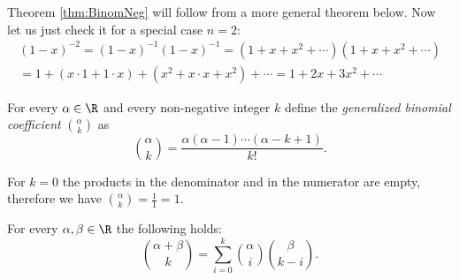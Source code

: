 \begin{page}
\setcounter{section}{2}
\setcounter{subsection}{4}
\setcounter{dfn}{14}
\label{portion:769}


Theorem \ref{thm:BinomNeg} will follow from a more general theorem below.
Now let us just check it for a special case $n=2$:
\begin{multline*}
(1-x)^{-2} = (1-x)^{-1} (1-x)^{-1} = (1 + x + x^2 + \cdots)(1 + x + x^2 + \cdots)\\
= 1 + (x \cdot 1 + 1 \cdot x) + (x^2 + x \cdot x + x^2) + \cdots
= 1 + 2x + 3x^2 + \cdots
\end{multline*}


\end{page}

\begin{page}
\setcounter{section}{2}
\setcounter{subsection}{4}
\setcounter{dfn}{15}
\label{portion:771}

\begin{dfn}
For every $\alpha \in \R$ and every non-negative integer $k$ define the \emph{generalized binomial coefficient} $\binom{\alpha}{k}$ as
\[
\binom{\alpha}{k} = \frac{\alpha(\alpha - 1) \cdots (\alpha - k + 1)}{k!}.
\]
\end{dfn}

\end{page}

\begin{page}
\setcounter{section}{2}
\setcounter{subsection}{4}
\setcounter{dfn}{15}
\label{portion:772}

For $k = 0$ the products in the denominator and in the numerator are empty, therefore we have $\binom{\alpha}{k} = \frac{1}{1} = 1$.


\end{page}

\begin{page}
\setcounter{section}{2}
\setcounter{subsection}{4}
\setcounter{dfn}{16}
\label{portion:774}

\begin{thm}
\label{thm:Vandermonde}
For every $\alpha, \beta \in \R$ the following holds:
\[
\binom{\alpha + \beta}{k} = \sum_{i=0}^k \binom{\alpha}{i} \binom{\beta}{k-i}.
\]
\end{thm}

\end{page}

